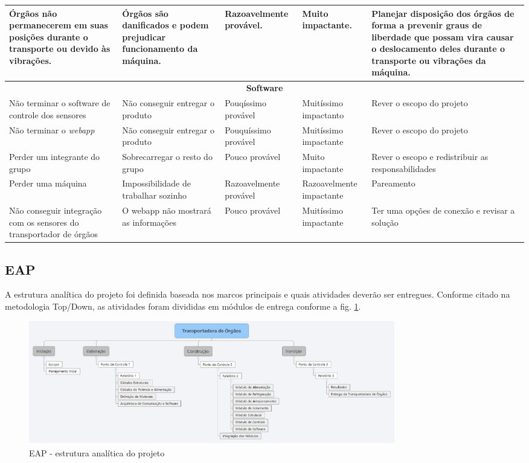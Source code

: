 \begin{longtable}{|m{2.8cm}|m{4cm}|m{2.5cm}|m{2.2cm}|m{4cm}|}
Órgãos não permanecerem em suas posições durante o transporte ou devido às vibrações. & Órgãos são danificados e podem prejudicar funcionamento da máquina. & Razoavelmente provável. & Muito impactante. & Planejar disposição dos órgãos de forma a prevenir graus de liberdade que possam vira causar o deslocamento deles durante o transporte ou vibrações da máquina. \\ \hline

\multicolumn{5}{|c|}{\textbf{Software}}\tabularnewline
\hline

Não terminar o software de controle dos sensores & Não conseguir entregar o produto & Pouqíssimo provável & Muitíssimo impactanto & Rever o escopo do projeto \\ \hline

Não terminar o \textit{webapp} & Não conseguir entregar o produto & Pouquíssimo provável  & 
Muitíssimo impactante  & Rever o escopo do projeto \\ \hline

Perder um integrante do grupo & Sobrecarregar o resto do grupo &
Pouco provável  & 
Muito impactante 
& Rever o escopo e redistribuir as responsabilidades \\ \hline

Perder uma máquina & Impossibilidade de trabalhar sozinho &
Razoavelmente provável  & 
Razoavelmente impactante 
& Pareamento \\ \hline

Não conseguir integração com os sensores do transportador de órgãos & O webapp não mostrará as informações &
Pouco provável  & 
Muitíssimo impactante 
& Ter uma opções de conexão e revisar a solução \\ \hline

\end{longtable}


\subsection{EAP}

A estrutura analítica do projeto foi definida baseada nos marcos principais e quais atividades deverão ser entregues. Conforme citado na metodologia Top/Down, as atividades foram divididas em módulos de entrega conforme a fig. \ref{eap}.

\begin{figure}[H]
	\centering
	\includegraphics[width=16cm]{figuras/eap.eps}
	\caption{EAP - estrutura analítica do projeto} \label{eap}
\end{figure}

